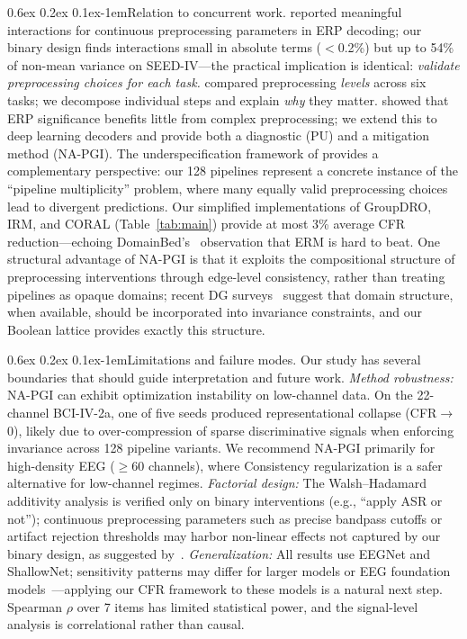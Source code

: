 \documentclass{article}
\makeatletter
\renewcommand{\paragraph}{\@startsection{paragraph}{4}{\z@}%
  {0.6ex \@plus 0.2ex \@minus 0.1ex}{-1em}{\normalsize\bf}}
\makeatother
\begin{document}
\paragraph{Relation to concurrent work.}
\citet{kessler2025preprocessing} reported meaningful interactions for continuous preprocessing parameters in ERP decoding; our binary design finds interactions small in absolute terms ($<$0.2\%) but up to 54\% of non-mean variance on SEED-IV---the practical implication is identical: \emph{validate preprocessing choices for each task.} \citet{delpup2025more} compared preprocessing \emph{levels} across six tasks; we decompose individual steps and explain \emph{why} they matter. \citet{delorme2023eeg} showed that ERP significance benefits little from complex preprocessing; we extend this to deep learning decoders and provide both a diagnostic (PU) and a mitigation method (NA-PGI). The underspecification framework of \citet{damour2022underspecification} provides a complementary perspective: our 128 pipelines represent a concrete instance of the ``pipeline multiplicity'' problem, where many equally valid preprocessing choices lead to divergent predictions. Our simplified implementations of GroupDRO, IRM, and CORAL (Table~\ref{tab:main}) provide at most 3\% average CFR reduction---echoing DomainBed's~\citep{gulrajani2021search} observation that ERM is hard to beat. One structural advantage of NA-PGI is that it exploits the compositional structure of preprocessing interventions through edge-level consistency, rather than treating pipelines as opaque domains; recent DG surveys~\citep{zhou2022domain} suggest that domain structure, when available, should be incorporated into invariance constraints, and our Boolean lattice provides exactly this structure.

\paragraph{Limitations and failure modes.}
Our study has several boundaries that should guide interpretation and future work.
\emph{Method robustness:} NA-PGI can exhibit optimization instability on low-channel data. On the 22-channel BCI-IV-2a, one of five seeds produced representational collapse (CFR$\to$0), likely due to over-compression of sparse discriminative signals when enforcing invariance across 128 pipeline variants. We recommend NA-PGI primarily for high-density EEG ($\geq$60 channels), where Consistency regularization is a safer alternative for low-channel regimes.
\emph{Factorial design:} The Walsh--Hadamard additivity analysis is verified only on binary interventions (e.g., ``apply ASR or not''); continuous preprocessing parameters such as precise bandpass cutoffs or artifact rejection thresholds may harbor non-linear effects not captured by our binary design, as suggested by~\citet{kessler2025preprocessing}.
\emph{Generalization:} All results use EEGNet and ShallowNet; sensitivity patterns may differ for larger models or EEG foundation models~\citep{kostas2021bendr,jiang2024large,csbrain2025,neuript2025,reve2025,wang2026neurostorm}---applying our CFR framework to these models is a natural next step. Spearman $\rho$ over 7 items has limited statistical power, and the signal-level analysis is correlational rather than causal.
\end{document}
